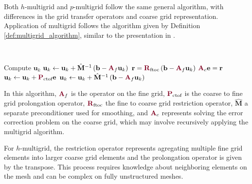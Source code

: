 Both $h$-multigrid and $p$-multigrid follow the same general algorithm, with differences in the grid transfer operators and coarse grid representation.
Application of multigrid follows the algorithm given by Definition \ref{def:multigrid_algorithm}, similar to the presentation in \cite{brandt1982guide}.
\begin{definition}\label{def:multigrid_algorithm}
~\\
\begin{algorithmic}[1]
\State Compute $\mathbf{u}_k$
\State $\mathbf{u}_k \gets \mathbf{u}_k + \hat{\mathbf{M}}^{-1} \left( \mathbf{b} - {\color{burgundy}\mathbf{A}}_f \mathbf{u}_k \right)$ 
\State $\mathbf{r} = {\color{burgundy}\mathbf{R}}_{\text{ftoc}} \left( \mathbf{b} - {\color{burgundy}\mathbf{A}}_f \mathbf{u}_k \right)$ 
\State ${\color{burgundy}\mathbf{A}}_c \mathbf{e} = \mathbf{r}$                                                                          
\State $\mathbf{u}_k \gets \mathbf{u}_k + {\color{burgundy}\mathbf{P}}_{\text{ctof}} \mathbf{e}$                                         
\State $\mathbf{u}_k \gets \mathbf{u}_k + \hat{\mathbf{M}}^{-1} \left( \mathbf{b} - {\color{burgundy}\mathbf{A}}_f \mathbf{u}_k \right)$ 
\end{algorithmic}
\end{definition}
In this algorithm, ${\color{burgundy}\mathbf{A}}_f$ is the operator on the fine grid, ${\color{burgundy}\mathbf{P}}_{\text{ctof}}$ is the coarse to fine grid prolongation operator, ${\color{burgundy}\mathbf{R}}_{\text{ftoc}}$ the fine to coarse grid restriction operator, $\hat{\mathbf{M}}$ a separate preconditioner used for smoothing, and ${\color{burgundy}\mathbf{A}}_c$ represents solving the error correction problem on the coarse grid, which may involve recursively applying the multigrid algorithm.

For $h$-multigrid, the restriction operator represents agregating multiple fine grid elements into larger coarse grid elements and the prolongation operator is given by the transpose.
This process requires knowledge about neighboring elements on the mesh and can be complex on fully unstructured meshes.

